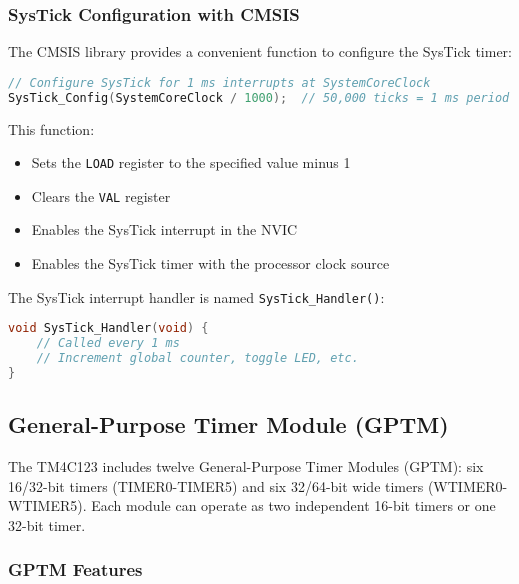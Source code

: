 \subsubsection{SysTick Configuration with CMSIS}

The CMSIS library provides a convenient function to configure the SysTick timer:

\begin{lstlisting}[caption={SysTick configuration using CMSIS}, language=C]
// Configure SysTick for 1 ms interrupts at SystemCoreClock
SysTick_Config(SystemCoreClock / 1000);  // 50,000 ticks = 1 ms period
\end{lstlisting}

\noindent
This function:
\begin{itemize}[nosep]
  \item Sets the \texttt{LOAD} register to the specified value minus 1
  \item Clears the \texttt{VAL} register
  \item Enables the SysTick interrupt in the NVIC
  \item Enables the SysTick timer with the processor clock source
\end{itemize}

\noindent
The SysTick interrupt handler is named \texttt{SysTick\_Handler()}:

\begin{lstlisting}[language=C]
void SysTick_Handler(void) {
    // Called every 1 ms
    // Increment global counter, toggle LED, etc.
}
\end{lstlisting}

\subsection{General-Purpose Timer Module (GPTM)}

The TM4C123 includes twelve General-Purpose Timer Modules (GPTM): six 16/32-bit timers (TIMER0-TIMER5) and six 32/64-bit wide timers (WTIMER0-WTIMER5). Each module can operate as two independent 16-bit timers or one 32-bit timer.

\subsubsection{GPTM Features}

